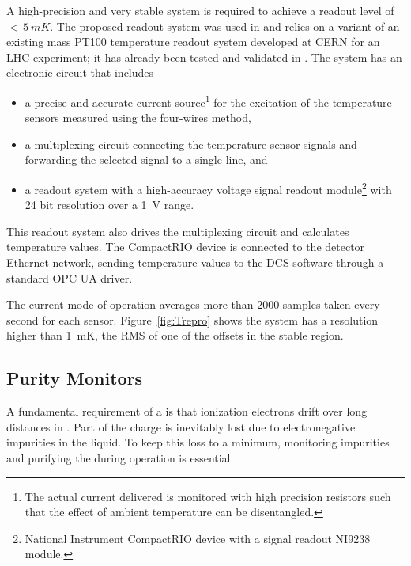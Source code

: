 A %
high-precision and very stable system is required to achieve a readout level of $<\,\SI{5}{mK}$.
The proposed readout system was used in  and relies on a variant of an existing mass PT100 temperature readout system developed at
CERN for an LHC experiment; it has already been tested and validated in .
The system has an electronic circuit that includes
\begin{itemize}
\item a precise and accurate current source\footnote{The actual current delivered is monitored with high precision resistors such that the effect of ambient temperature can be disentangled.} for the excitation of the temperature sensors measured using the four-wires method, 
\item a multiplexing circuit connecting the temperature sensor signals and forwarding the selected signal to a single line, and 
\item a readout system  with a high-accuracy voltage signal readout module\footnote{National Instrument CompactRIO\texttrademark{} device  with a signal readout NI9238\texttrademark{} module.} with 24 bit resolution over a \SI{1}{V} range.
\end{itemize}
This readout system also drives the multiplexing circuit and calculates temperature values. The CompactRIO device is connected to the detector Ethernet network, sending temperature values to the DCS software through a standard OPC UA driver.


The current mode of operation averages more than \num{2000} samples taken every second for each sensor. 
Figure~\ref{fig:Trepro} shows the system has a resolution higher than 
\SI{1}{mK}, the RMS of one of the offsets in the stable region.



\subsection{Purity Monitors}
\label{sec:fdgen-slow-cryo-purity-mon}

A fundamental requirement of a   is that ionization electrons drift over long distances in . Part of the charge is inevitably lost due to electronegative impurities in the liquid. To keep this loss to a minimum, monitoring impurities and purifying the  during operation is essential.




